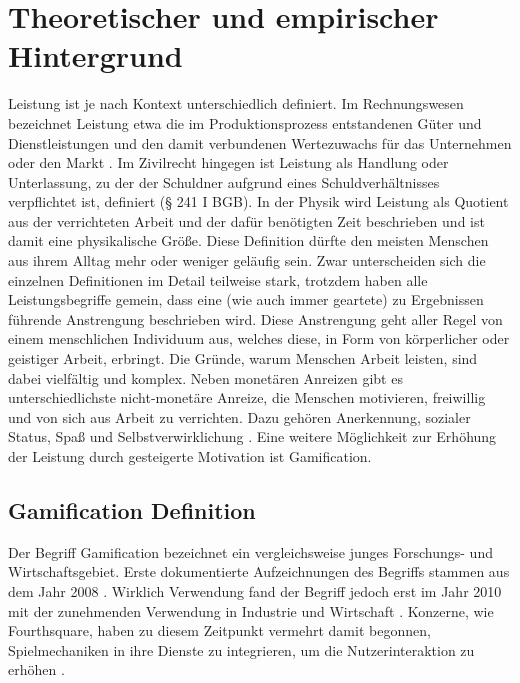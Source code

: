 \section{Theoretischer und empirischer Hintergrund}
Leistung ist je nach Kontext unterschiedlich definiert. Im Rechnungswesen bezeichnet Leistung etwa die im Produktionsprozess entstandenen Güter und Dienstleistungen und den damit verbundenen Wertezuwachs für das Unternehmen oder den Markt \cite{woeltje2010abc}. Im Zivilrecht hingegen ist Leistung als Handlung oder Unterlassung, zu der der Schuldner aufgrund eines Schuldverhältnisses verpflichtet ist, definiert (§ 241 I BGB). In der Physik wird Leistung als Quotient aus der verrichteten Arbeit und der dafür benötigten Zeit beschrieben und ist damit eine physikalische Größe. Diese Definition dürfte den meisten Menschen aus ihrem Alltag mehr oder weniger geläufig sein. Zwar unterscheiden sich die einzelnen Definitionen im Detail teilweise stark, trotzdem haben alle Leistungsbegriffe gemein, dass eine (wie auch immer geartete) zu Ergebnissen führende Anstrengung beschrieben wird. Diese Anstrengung geht aller Regel von einem menschlichen Individuum aus, welches diese, in Form von körperlicher oder geistiger Arbeit, erbringt. Die Gründe, warum Menschen Arbeit leisten, sind dabei vielfältig und komplex. Neben monetären Anreizen gibt es unterschiedlichste nicht-monetäre Anreize, die Menschen motivieren, freiwillig und von sich aus Arbeit zu verrichten. Dazu gehören Anerkennung, sozialer Status, Spaß und Selbstverwirklichung \cite{shujaat}. Eine weitere Möglichkeit zur Erhöhung der Leistung durch gesteigerte Motivation ist Gamification. 

\subsection{Gamification Definition}
Der Begriff Gamification bezeichnet ein vergleichsweise junges Forschungs- und Wirtschaftsgebiet. Erste dokumentierte Aufzeichnungen des Begriffs stammen aus dem Jahr 2008 \cite{huotari_defining_2012, deterding_game_2011}. Wirklich Verwendung fand der Begriff jedoch erst im Jahr 2010 mit der zunehmenden Verwendung in Industrie und Wirtschaft \cite{huotari_defining_2012}. Konzerne, wie Fourthsquare, haben zu diesem Zeitpunkt vermehrt damit begonnen, Spielmechaniken in ihre Dienste zu integrieren, um die Nutzerinteraktion zu erhöhen \cite{deterding_game_2011}.

